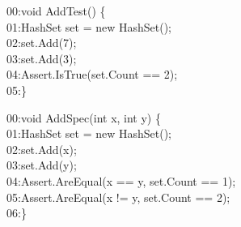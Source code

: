 \begin{figure}[t]
\begin{CodeOut}
00:void AddTest() \{\\
01:\hspace*{0.2in}HashSet set = new HashSet();\\
02:\hspace*{0.2in}set.Add(7);\\
03:\hspace*{0.2in}set.Add(3);\\
04:\hspace*{0.2in}Assert.IsTrue(set.Count == 2);\\
05:\}
\end{CodeOut}\vspace*{-4ex}
\begin{CodeOut}
00:void AddSpec(int x, int y) \{\\
01:\hspace*{0.2in}HashSet set = new HashSet();\\
02:\hspace*{0.2in}set.Add(x);\\
03:\hspace*{0.2in}set.Add(y);\\
04:\hspace*{0.2in}Assert.AreEqual(x == y, set.Count == 1);\\
05:\hspace*{0.2in}Assert.AreEqual(x != y, set.Count == 2);\\
06:\}
\end{CodeOut}\vspace*{-4ex}
\vspace*{-2ex}
\end{figure}

